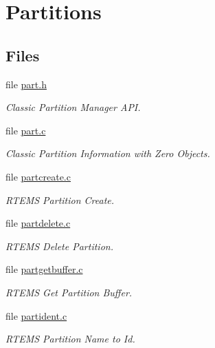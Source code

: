 \hypertarget{group__ClassicPart}{}\section{Partitions}
\label{group__ClassicPart}
\subsection*{Files}
\begin{DoxyCompactItemize}
\item 
file \mbox{\hyperlink{part_8h}{part.\+h}}
\begin{DoxyCompactList}\small\item\em Classic Partition Manager A\+PI. \end{DoxyCompactList}\item 
file \mbox{\hyperlink{part_8c}{part.\+c}}
\begin{DoxyCompactList}\small\item\em Classic Partition Information with Zero Objects. \end{DoxyCompactList}\item 
file \mbox{\hyperlink{partcreate_8c}{partcreate.\+c}}
\begin{DoxyCompactList}\small\item\em R\+T\+E\+MS Partition Create. \end{DoxyCompactList}\item 
file \mbox{\hyperlink{partdelete_8c}{partdelete.\+c}}
\begin{DoxyCompactList}\small\item\em R\+T\+E\+MS Delete Partition. \end{DoxyCompactList}\item 
file \mbox{\hyperlink{partgetbuffer_8c}{partgetbuffer.\+c}}
\begin{DoxyCompactList}\small\item\em R\+T\+E\+MS Get Partition Buffer. \end{DoxyCompactList}\item 
file \mbox{\hyperlink{partident_8c}{partident.\+c}}
\begin{DoxyCompactList}\small\item\em R\+T\+E\+MS Partition Name to Id. \end{DoxyCompactList}\end{DoxyCompactItemize}
